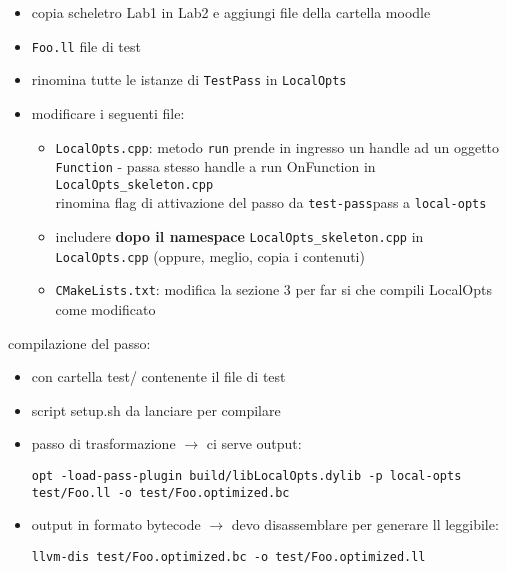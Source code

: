 \begin{emphasize-blue}
  \begin{itemize}
    \item copia scheletro Lab1 in Lab2 e aggiungi file della cartella moodle
    \item \lstinline|Foo.ll| file di test
    \item rinomina tutte le istanze di \lstinline|TestPass| in \lstinline|LocalOpts|
    \item modificare i seguenti file:
      \begin{itemize}
        \item \lstinline|LocalOpts.cpp|: metodo \lstinline|run| prende in ingresso un handle ad un oggetto \lstinline|Function| - passa stesso handle a run OnFunction in \lstinline|LocalOpts_skeleton.cpp|\\
              rinomina flag di attivazione del passo da \lstinline|test-pass|pass a \lstinline|local-opts|
        \item includere \textbf{dopo il namespace} \lstinline|LocalOpts_skeleton.cpp| in \lstinline|LocalOpts.cpp| (oppure, meglio, copia i contenuti)
        \item \lstinline|CMakeLists.txt|: modifica la sezione 3 per far si che compili LocalOpts come modificato
      \end{itemize}
\end{itemize}
compilazione del passo:
\begin{itemize}
  \item con cartella test/ contenente il file di test
  \item script setup.sh da lanciare per compilare
  \item passo di trasformazione $\rightarrow$ ci serve output:\\
    \begin{lstlisting}
opt -load-pass-plugin build/libLocalOpts.dylib -p local-opts test/Foo.ll -o test/Foo.optimized.bc\end{lstlisting}
  \item output in formato bytecode $\rightarrow$ devo disassemblare per generare ll leggibile:\\
  \begin{lstlisting}
llvm-dis test/Foo.optimized.bc -o test/Foo.optimized.ll\end{lstlisting}
  
\end{itemize}

\end{emphasize-blue}


